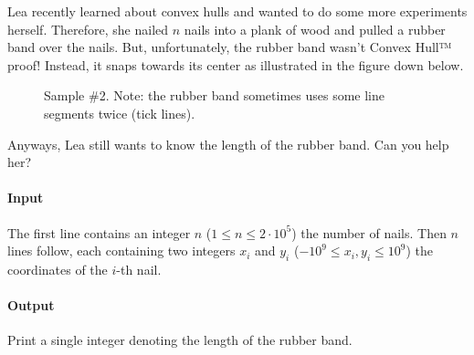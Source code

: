 
\usepackage{tkz-euclide}



\makeheader

Lea recently learned about convex hulls and wanted to
do some more experiments herself.
Therefore, she nailed $n$ nails into a plank of wood and
pulled a rubber band over the nails.
But, unfortunately, the rubber band wasn't Convex Hull™ proof!
Instead, it snaps towards its center as illustrated in the figure down below.
\begin{figure}[ht]
  \centering
  \caption{Sample \#2. Note: the rubber band sometimes uses some line segments twice (tick lines).}
  \label{fig:convexhull}
\end{figure}
Anyways, Lea still wants to know the length of the rubber band.
Can you help her?

\paragraph*{Input}

The first line contains an integer $n$ ($1 \leq n \leq 2\cdot10^5$) the number of nails.
Then $n$ lines follow, each containing two integers $x_i$ and $y_i$ ($-10^9 \leq x_i, y_i \leq 10^9$)
the coordinates of the $i$-th nail.

\paragraph*{Output}

Print a single integer denoting the length of the rubber band.

\begin{samples}
\end{samples}

